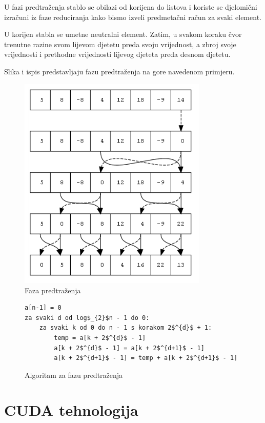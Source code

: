 \documentclass[times, utf8, zavrsni, numeric]{fer}
\begin{document}
U fazi predtraženja stablo se obilazi od korijena do listova i koriste se djelomični izračuni iz faze reduciranja kako bismo izveli predmetačni račun za svaki element.

U korijen stabla se umetne neutralni element. Zatim, u svakom koraku čvor trenutne razine svom lijevom djetetu preda svoju vrijednost, a zbroj svoje vrijednosti i prethodne vrijednosti lijevog djeteta preda desnom djetetu.

Slika i ispis predstavljaju fazu predtraženja na gore navedenom primjeru.
\pagebreak

\begin{figure}[Htb]
\centering
\includegraphics[width=90mm]{predtrazenje.png}
\caption{Faza predtraženja}
\label{predtrazenje}
\end{figure}

\begin{figure}[hbt]
\begin{singlespace}
\begin{lstlisting}[label={prescan}]
a[n-1] = 0
za svaki d od log$_{2}$n - 1 do 0:
	za svaki k od 0 do n - 1 s korakom 2$^{d}$ + 1:
		temp = a[k + 2$^{d}$ - 1]
		a[k + 2$^{d}$ - 1] = a[k + 2$^{d+1}$ - 1]
		a[k + 2$^{d+1}$ - 1] = temp + a[k + 2$^{d+1}$ - 1]
\end{lstlisting}
\end{singlespace}
\caption{Algoritam za fazu predtraženja}
\label{prescanalgoritam}
\end{figure}

\chapter{CUDA tehnologija}
\indent
\end{document}

